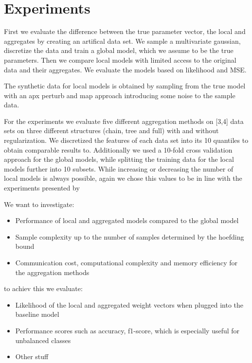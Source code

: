 
\chapter{Experiments}
\label{chapter:ch5}
First we evaluate the difference between the true parameter vector, the local and aggregates by creating an artifical data set. We sample a multivariate gaussian, discretize the data and train a global model, which we assume to be the true parameters.
Then we compare local models with limited access to the original data and their aggregates. We evaluate the models based on likelihood and MSE.

The synthetic data for local models is obtained by sampling from the true model with an apx perturb and map approach introducing some noise to the sample data. 

For the experiments we evaluate five different aggregation methods on [3,4] data sets on three different structures (chain, tree and full) with and without regularization.
We discretized the features of each data set into its 10 quantiles to obtain comparable results to. 
Additionally we used a 10-fold cross validation approach for the global models, while splitting the training data for the local models further into 10 subsets.
While increasing or decreasing the number of local models is always possible, again we chose this values to be in line with the experiments presented by

We want to investigate:
\begin{itemize}
    \item Performance of local and aggregated models compared to the global model
    \item Sample complexity up to the number of samples determined by the hoefding bound 
    \item Communication cost, computational complexity and memory efficiency for the aggregation methods
\end{itemize}

to achiev this we evaluate:

\begin{itemize}
    \item Likelihood of the local and aggregated weight vectors when plugged into the baseline model 
    \item Performance scores such as accuracy, f1-score, which is especially useful for unbalanced classes 
    \item Other stuff 
\end{itemize}